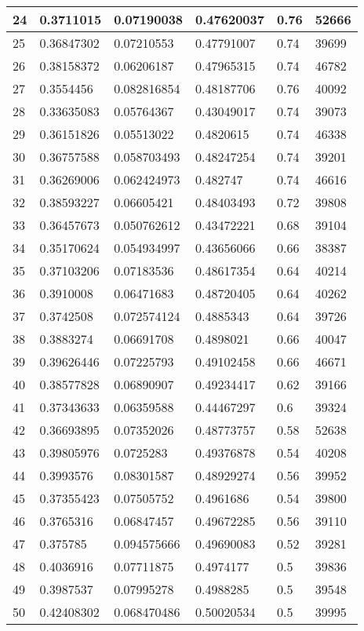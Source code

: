 \begin{longtable}{|l|l|l|l|l|l|}
24 & 0.3711015 & 0.07190038 & 0.47620037 & 0.76 & 52666 \\ \hline 
25 & 0.36847302 & 0.07210553 & 0.47791007 & 0.74 & 39699 \\ \hline 
26 & 0.38158372 & 0.06206187 & 0.47965315 & 0.74 & 46782 \\ \hline 
27 & 0.3554456 & 0.082816854 & 0.48187706 & 0.76 & 40092 \\ \hline 
28 & 0.33635083 & 0.05764367 & 0.43049017 & 0.74 & 39073 \\ \hline 
29 & 0.36151826 & 0.05513022 & 0.4820615 & 0.74 & 46338 \\ \hline 
30 & 0.36757588 & 0.058703493 & 0.48247254 & 0.74 & 39201 \\ \hline 
31 & 0.36269006 & 0.062424973 & 0.482747 & 0.74 & 46616 \\ \hline 
32 & 0.38593227 & 0.06605421 & 0.48403493 & 0.72 & 39808 \\ \hline 
33 & 0.36457673 & 0.050762612 & 0.43472221 & 0.68 & 39104 \\ \hline 
34 & 0.35170624 & 0.054934997 & 0.43656066 & 0.66 & 38387 \\ \hline 
35 & 0.37103206 & 0.07183536 & 0.48617354 & 0.64 & 40214 \\ \hline 
36 & 0.3910008 & 0.06471683 & 0.48720405 & 0.64 & 40262 \\ \hline 
37 & 0.3742508 & 0.072574124 & 0.4885343 & 0.64 & 39726 \\ \hline 
38 & 0.3883274 & 0.06691708 & 0.4898021 & 0.66 & 40047 \\ \hline 
39 & 0.39626446 & 0.07225793 & 0.49102458 & 0.66 & 46671 \\ \hline 
40 & 0.38577828 & 0.06890907 & 0.49234417 & 0.62 & 39166 \\ \hline 
41 & 0.37343633 & 0.06359588 & 0.44467297 & 0.6 & 39324 \\ \hline 
42 & 0.36693895 & 0.07352026 & 0.48773757 & 0.58 & 52638 \\ \hline 
43 & 0.39805976 & 0.0725283 & 0.49376878 & 0.54 & 40208 \\ \hline 
44 & 0.3993576 & 0.08301587 & 0.48929274 & 0.56 & 39952 \\ \hline 
45 & 0.37355423 & 0.07505752 & 0.4961686 & 0.54 & 39800 \\ \hline 
46 & 0.3765316 & 0.06847457 & 0.49672285 & 0.56 & 39110 \\ \hline 
47 & 0.375785 & 0.094575666 & 0.49690083 & 0.52 & 39281 \\ \hline 
48 & 0.4036916 & 0.07711875 & 0.4974177 & 0.5 & 39836 \\ \hline 
49 & 0.3987537 & 0.07995278 & 0.4988285 & 0.5 & 39548 \\ \hline 
50 & 0.42408302 & 0.068470486 & 0.50020534 & 0.5 & 39995 \\ \hline 
\end{longtable}
